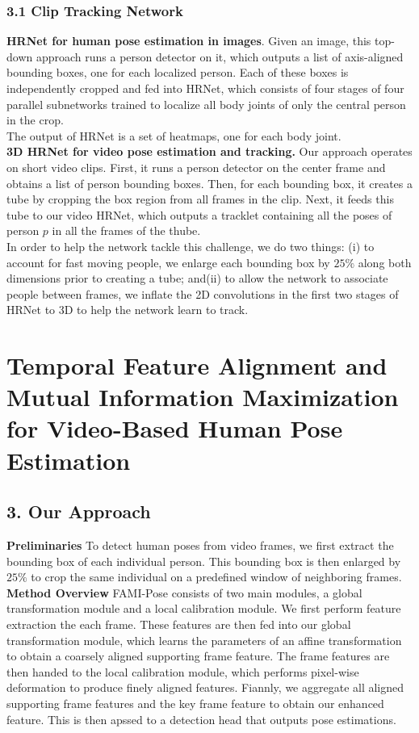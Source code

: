 \documentclass[a4paper]{report}
\begin{document}
\subsection*{3.1 Clip Tracking Network}
\textbf{HRNet for human pose estimation in images}. Given an image, this top-down approach runs a person detector on it, which outputs a list of axis-aligned bounding boxes, one for each localized person. Each of these boxes is independently cropped and fed into HRNet, which consists of four stages of four parallel subnetworks trained to localize all body joints of only the central person in the crop.
\\
The output of HRNet is a set of heatmaps, one for each body joint. 
\\
\textbf{3D HRNet for video pose estimation and tracking.} Our approach operates on short video clips. First, it runs a person detector on the center frame and obtains a list of person bounding boxes. Then, for each bounding box, it creates a tube by cropping the box region from all frames in the clip. Next, it feeds this tube to our video HRNet, which outputs a tracklet containing all the poses of person $p$ in all the frames of the thube.
\\
In order to help the network tackle this challenge, we do two things: (i) to account for fast moving people, we enlarge each bounding box by $25\%$ along both dimensions prior to creating a tube; and(ii) to allow the network to associate people between frames, we inflate the 2D convolutions in the first two stages of HRNet to 3D to help the network learn to track. 

\chapter*{Temporal Feature Alignment and Mutual Information Maximization for Video-Based Human Pose Estimation}
\section*{3. Our Approach}
\textbf{Preliminaries} To detect human poses from video frames, we first extract the bounding box of each individual person. This bounding box is then enlarged by $25\%$ to crop the same individual on a predefined window of neighboring frames. 
\\
\textbf{Method Overview} FAMI-Pose consists of two main modules, a global transformation module and a local calibration module. We first perform feature extraction the each frame. These features are then fed into our global transformation module, which learns the parameters of an affine transformation to obtain a coarsely aligned supporting frame feature. The frame features are then handed to the local calibration module, which performs pixel-wise deformation to produce finely aligned features. Fiannly, we aggregate all aligned supporting frame features and the key frame feature to obtain our enhanced feature. This is then apssed to a detection head that outputs pose estimations.
\end{document}
